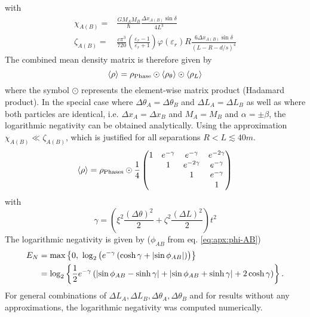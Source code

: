 with 
\begin{align}
  \chi_{A(B)} =& \frac{G M_A M_B}{\hbar}\frac{\Delta x_{A(B)}\sin\delta}{4L^3} \\ \label{eq:apx:definition-zeta}
  \zeta_{A(B)} =& \frac{c\pi^3}{720}\left(\frac{\varepsilon_r - 1}{\varepsilon_r + 1}\right)\varphi(\varepsilon_r) R \frac{6\Delta x_{A(B)} \sin\delta}{(L-R-d/s)^4}
\end{align}
The combined mean density matrix is therefore given by
\begin{equation}
  \left\langle\rho\right\rangle = \rho_\mathrm{Phase} \odot \left\langle\rho_{\theta}\right\rangle \odot \left\langle\rho_{L}\right\rangle
\end{equation}
where the symbol $\odot$ represents the element-wise matrix product (Hadamard product).
In the special case where $\Delta \theta_A = \Delta \theta_B$ and $\Delta L_A = \Delta L_B$ as well as where both particles are identical, i.e. $\Delta x_A = \Delta x_B$ and $M_A=M_B$ and $\alpha=\pm\beta$, the logarithmic negativity can be obtained analytically.
Using the approximation $\chi_{A(B)} \ll \zeta_{A(B)}$, which is justified for all separations $R < L \lesssim 40 \si{m}$.
\begin{equation}
  \left\langle\rho\right\rangle = \rho_\mathrm{Phases} \odot \frac{1}{4}\begin{pmatrix}
    1 & e^{-\gamma} & e^{-\gamma} & e^{-2\gamma} \\
    & 1 & e^{-2\gamma} & e^{-\gamma} \\
    & & 1 & e^{-\gamma} \\
    & & & 1
  \end{pmatrix}
\end{equation}
with 
\begin{equation}\label{eq:apx:stochastic-decoherence}
  \gamma = \left( \xi^2 \frac{(\Delta \theta)^2}{2} + \zeta^2 \frac{(\Delta L)^2}{2} \right) t^2
\end{equation}
The logarithmic negativity is given by ($\phi_{AB}$ from eq. \eqref{eq:apx:phi-AB})
\begin{align}\label{eq:apx:stochastic-variations-logarithmic-negativity}
  E_N &= \max\left\{0,\ \log_2\left(e^{-\gamma}\left(\cosh\gamma + \left\lvert\sin\phi_{AB}\right\rvert\right)\right)\right\} \\
  &= \log_2\left\{ \frac{1}{2} e^{-\gamma} \left(\left\lvert\sin\phi_{AB}-\sinh\gamma\right\rvert + \left\lvert\sin\phi_{AB}+\sinh\gamma\right\rvert + 2\cosh\gamma\right) \right\} .
\end{align}
For general combinations of $\Delta L_A, \Delta L_B, \Delta \theta_A, \Delta \theta_B$ and for results without any approximations, the logarithmic negativity was computed numerically. 




